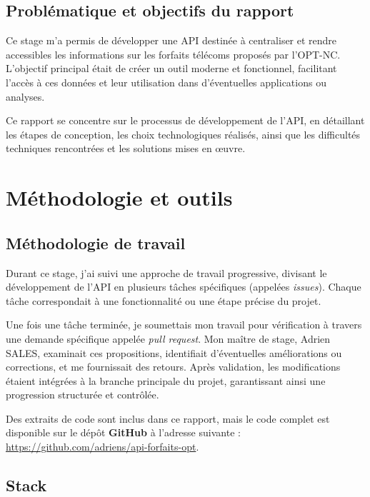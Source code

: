 \documentclass[11pt]{article}
\begin{document}
		\subsection{Problématique et objectifs du rapport}
		
		Ce stage m’a permis de développer une API destinée à centraliser et rendre accessibles les informations sur les forfaits télécoms proposés par l’OPT-NC. L’objectif principal était de créer un outil moderne et fonctionnel, facilitant l’accès à ces données et leur utilisation dans d’éventuelles applications ou analyses.
		
		Ce rapport se concentre sur le processus de développement de l’API, en détaillant les étapes de conception, les choix technologiques réalisés, ainsi que les difficultés techniques rencontrées et les solutions mises en œuvre.
		
		\newpage
		\section{Méthodologie et outils}
		
		\subsection{Méthodologie de travail}
		
		Durant ce stage, j'ai suivi une approche de travail progressive, divisant le développement de l'API en plusieurs tâches spécifiques (appelées \textit{issues}). Chaque tâche correspondait à une fonctionnalité ou une étape précise du projet.
		
		Une fois une tâche terminée, je soumettais mon travail pour vérification à travers une demande spécifique appelée \textit{pull request}. Mon maître de stage, Adrien SALES, examinait ces propositions, identifiait d'éventuelles améliorations ou corrections, et me fournissait des retours. Après validation, les modifications étaient intégrées à la branche principale du projet, garantissant ainsi une progression structurée et contrôlée.
		
		Des extraits de code sont inclus dans ce rapport, mais le code complet est disponible sur le dépôt \textbf{GitHub} à l'adresse suivante : \url{https://github.com/adriens/api-forfaits-opt}.
		
		\subsection{Stack}
		
\end{document}

